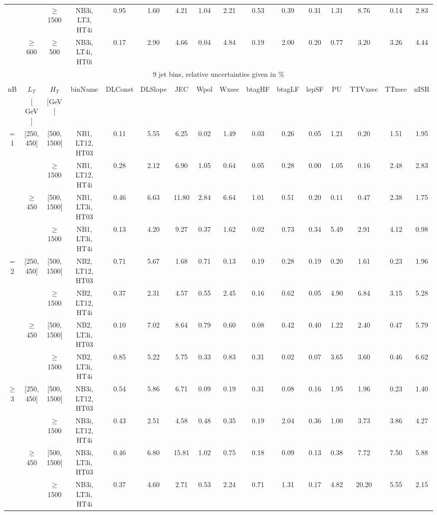 \begin{table}[ht]
\begin{center}
\begin{tabular}{|c | c | c | c | c | c | c | c | c | c | c | c | c | c | c | c | }
\cline{3-16}  & & $\geq$ 1500 &NB3i, LT3, HT4i & 0.95 & 1.60 & 4.21 & 1.04 & 2.21 & 0.53 & 0.39 & 0.31 & 1.31 & 8.76 & 0.14 & 2.83 \\ 
\cline{2-16}   & $\geq$ 600 & $\geq$ 500&NB3i, LT4i, HT0i & 0.17 & 2.90 & 4.66 & 0.04 & 4.84 & 0.19 & 2.00 & 0.20 & 0.77 & 3.20 & 3.26 & 4.44 \\ 
 \hline 
\multicolumn{16}{|c|}{9 jet bins, relative uncertainties given in \%} \\ 
\multicolumn{16}{|c|}{} \\ \hline 
nB &  $L_T$ & $H_T$ & binName & DLConst & DLSlope & JEC & Wpol & Wxsec & btagHF & btagLF & lepSF & PU & TTVxsec & TTxsec & nISR  \\ 
   & $[$ GeV $]$  &  $[$GeV$]$  &  &  &  &  &  &  &  &  &  &  &  &  &   \\ \hline 
\cline{1-16} $=$ 1 & [250, 450] & [500, 1500]&NB1, LT12, HT03 & 0.11 & 5.55 & 6.25 & 0.02 & 1.49 & 0.03 & 0.26 & 0.05 & 1.21 & 0.20 & 1.51 & 1.95 \\ 
\cline{3-16}  & & $\geq$ 1500 &NB1, LT12, HT4i & 0.28 & 2.12 & 6.90 & 1.05 & 0.64 & 0.05 & 0.28 & 0.00 & 1.05 & 0.16 & 2.48 & 2.83 \\ 
\cline{2-16}   & $\geq$ 450 & [500, 1500]&NB1, LT3i, HT03 & 0.46 & 6.63 & 11.80 & 2.84 & 6.64 & 1.01 & 0.51 & 0.20 & 0.11 & 0.47 & 2.38 & 1.75 \\ 
\cline{3-16}  & & $\geq$ 1500 &NB1, LT3i, HT4i & 0.13 & 4.20 & 9.27 & 0.37 & 1.62 & 0.02 & 0.73 & 0.34 & 5.49 & 2.91 & 4.12 & 0.98 \\ 
\cline{1-16} $=$ 2 & [250, 450] & [500, 1500]&NB2, LT12, HT03 & 0.71 & 5.67 & 1.68 & 0.71 & 0.13 & 0.19 & 0.28 & 0.19 & 0.20 & 1.61 & 0.23 & 1.96 \\ 
\cline{3-16}  & & $\geq$ 1500 &NB2, LT12, HT4i & 0.37 & 2.31 & 4.57 & 0.55 & 2.45 & 0.16 & 0.62 & 0.05 & 4.90 & 6.84 & 3.15 & 5.28 \\ 
\cline{2-16}   & $\geq$ 450 & [500, 1500]&NB2, LT3i, HT03 & 0.10 & 7.02 & 8.64 & 0.79 & 0.60 & 0.08 & 0.42 & 0.40 & 1.22 & 2.40 & 0.47 & 5.79 \\ 
\cline{3-16}  & & $\geq$ 1500 &NB2, LT3i, HT4i & 0.85 & 5.22 & 5.75 & 0.33 & 0.83 & 0.31 & 0.02 & 0.07 & 3.65 & 3.60 & 0.46 & 6.62 \\ 
\cline{1-16} $\geq$ 3 & [250, 450] & [500, 1500]&NB3i, LT12, HT03 & 0.54 & 5.86 & 6.71 & 0.09 & 0.19 & 0.31 & 0.08 & 0.16 & 1.95 & 1.96 & 0.23 & 1.40 \\ 
\cline{3-16}  & & $\geq$ 1500 &NB3i, LT12, HT4i & 0.43 & 2.51 & 4.58 & 0.48 & 0.35 & 0.19 & 2.04 & 0.36 & 1.00 & 3.73 & 3.86 & 4.27 \\ 
\cline{2-16}   & $\geq$ 450 & [500, 1500]&NB3i, LT3i, HT03 & 0.46 & 6.80 & 15.81 & 1.02 & 0.75 & 0.18 & 0.09 & 0.13 & 0.38 & 7.72 & 7.50 & 5.88 \\ 
\cline{3-16}  & & $\geq$ 1500 &NB3i, LT3i, HT4i & 0.37 & 4.60 & 2.71 & 0.53 & 2.24 & 0.71 & 1.31 & 0.17 & 4.82 & 20.20 & 5.55 & 2.15 \\ 
 \hline 
\hline 
\end{tabular} 
\end{center} 
\end{table} 
